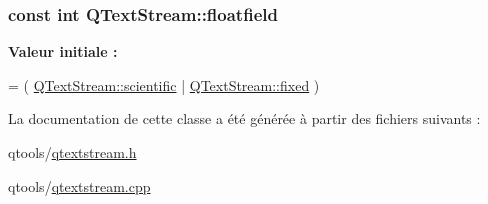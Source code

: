 \subsubsection[{floatfield}]{\setlength{\rightskip}{0pt plus 5cm}const int Q\+Text\+Stream\+::floatfield\hspace{0.3cm}{\ttfamily [static]}}\label{class_q_text_stream_a01b7c551fcbc8389b7dffa2348a57066}
{\bfseries Valeur initiale \+:}
\begin{DoxyCode}
= ( \hyperlink{class_q_text_stream_acec251f58a9b0a3a44e51f11459489fda3a93eea48718621e8f43d48968394584}{QTextStream::scientific} |
                       \hyperlink{class_q_text_stream_acec251f58a9b0a3a44e51f11459489fdadaaa76770e0065770aaaebb974f22f23}{QTextStream::fixed} )
\end{DoxyCode}


La documentation de cette classe a été générée à partir des fichiers suivants \+:\begin{DoxyCompactItemize}
\item 
qtools/\hyperlink{qtextstream_8h}{qtextstream.\+h}\item 
qtools/\hyperlink{qtextstream_8cpp}{qtextstream.\+cpp}\end{DoxyCompactItemize}
